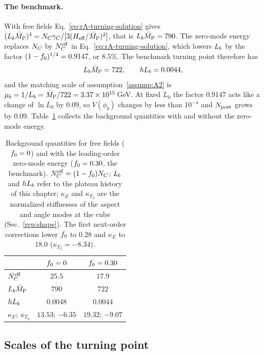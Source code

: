 \paragraph{The benchmark.}
With free fields Eq.~\eqref{eq:rA-turning-solution} gives $(L_b\bar M_{\mathrm{P}})^4=N_C\gamma_C/[3(H_{\mathrm{eff}}/\bar M_{\mathrm{P}})^2]$, that is $L_b\bar M_{\mathrm{P}}=790$. %
The zero-mode energy replaces $N_C$ by $N_C^{\mathrm{eff}}$ in Eq.~\eqref{eq:rA-turning-solution}, which lowers $L_b$ by the factor $(1-f_0)^{1/4}=0.9147$, or $8.5\%$. %
The benchmark turning point therefore has
\begin{equation}
\Lb\MPbar=722,\qquad h\Lb=0.0044, %
\label{eq:rA-benchmark}
\end{equation}
and the matching scale of assumption~\ref{assump:A2} is $\mu_b=1/L_b=\bar M_{\mathrm{P}}/722=3.37\times10^{15}$\,GeV. %
At fixed $L_0$ the factor $0.9147$ acts like a change of $\ln L_0$ by $0.09$, so $V(\phi_b)$ changes by less than $10^{-4}$ and $N_{\rm post}$ grows by $0.09$. %
Table~\ref{tab:rA-fzero} collects the background quantities with and without the zero-mode energy.

\begin{table}[tbp]
\centering
\caption{Background quantities for free fields ($f_0=0$) and with the leading-order zero-mode energy ($f_0=0.30$, the benchmark). %
$N_C^{\mathrm{eff}}=(1-f_0)N_C$; $L_b$ and $hL_b$ refer to the plateau history of this chapter; $\kappa_E$ and $\kappa_{T_2}$ are the normalized stiffnesses of the aspect and angle modes at the cube (Sec.~\ref{rep:shape}).
The first next-order corrections lower $f_0$ to $0.28$ and $\kappa_E$ to $18.0$ ($\kappa_{T_2}=-8.34$).} %
\label{tab:rA-fzero}
\begin{tabular}{lcc}
\toprule
 & $f_0=0$ & $f_0=0.30$\\ %
\midrule
$N_C^{\mathrm{eff}}$ & $25.5$ & $17.9$\\ %
$L_b\bar M_{\mathrm{P}}$ & $790$ & $722$\\ %
$hL_b$ & $0.0048$ & $0.0044$\\ %
$\kappa_E$; $\kappa_{T_2}$ & $13.53$; $-6.35$ & $19.32$; $-9.07$\\ %
\bottomrule
\end{tabular}
\end{table}

\subsection{Scales of the turning point}
\label{rA:turn-scales}

